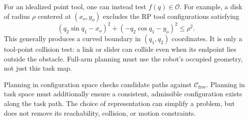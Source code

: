 For an idealized point tool, one can instead test $f(q)\in\mathcal O$.
For example, a disk of radius $\rho$ centered at $(x_o,y_o)$ excludes
the RP tool configurations satisfying
\[
 (q_2\sin q_1-x_o)^2+(-q_2\cos q_1-y_o)^2\le\rho^2.
\]
This generally produces a curved boundary in $(q_1,q_2)$ coordinates.
It is only a tool-point collision test: a link or slider can collide
even when its endpoint lies outside the obstacle. Full-arm planning must
use the robot's occupied geometry, not just this task map.

Planning in configuration space checks candidate paths against
$\mathcal C_{\mathrm{free}}$. Planning in task space must additionally
ensure a consistent, admissible configuration exists along the task path.
The choice of representation can simplify a problem, but does not remove
its reachability, collision, or motion constraints.

\clearpage

